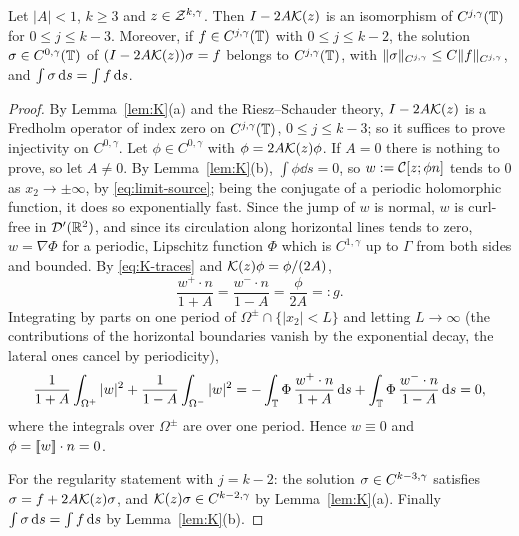 \begin{proposition}\label{prop:invert}
Let $|A|<1$, $k\ge3$ and $z\in\mathcal{Z}^{k,\gamma}$. Then $I-2A\mathcal{K}(z)$ is an isomorphism of $C^{j,\gamma}(\mathbb{T})$ for $0\le j\le k-3$. Moreover, if $f\in C^{j,\gamma}(\mathbb{T})$ with $0\le j\le k-2$, the
solution $\sigma\in C^{0,\gamma}(\mathbb{T})$ of $(I-2A\mathcal{K}(z))\sigma=f$ belongs to $C^{j,\gamma}(\mathbb{T})$, with $\|\sigma\|_{C^{j,\gamma}}\le C\|f\|_{C^{j,\gamma}}$, and $\int\sigma\,\mathrm{d} s=\int f\,\mathrm{d} s$.
\end{proposition}

\begin{proof}
By Lemma~\ref{lem:K}(a) and the Riesz--Schauder theory, $I-2A\mathcal{K}(z)$ is a Fredholm operator of index zero on $C^{j,\gamma}(\mathbb{T})$, $0\le j\le k-3$; so it suffices to prove injectivity on $C^{0,\gamma}$.
Let $\phi\in C^{0,\gamma}$ with $\phi=2A\mathcal{K}(z)\phi$. If $A=0$ there is nothing to prove, so let $A\ne0$. By Lemma~\ref{lem:K}(b), $\int\phi\dd s=0$, so $w:=\mathcal{C}[z;\phi n]$ tends to $0$ as
$x_2\to\pm\infty$, by \eqref{eq:limit-source}; being the conjugate of a periodic holomorphic function, it does so exponentially fast. Since the jump of $w$ is normal, $w$ is curl-free in $\mathcal D'(\mathbb{R}^2)$,
and since its circulation along horizontal lines tends to zero, $w=\nabla\Phi$ for a periodic, Lipschitz function $\Phi$ which is $C^{1,\gamma}$ up to $\Gamma$ from both sides and bounded.
By \eqref{eq:K-traces} and $\mathcal{K}(z)\phi=\phi/(2A)$,
\[
\frac{w^+\cdot n}{1+A}=\frac{w^-\cdot n}{1-A}=\frac{\phi}{2A}=:g .
\]
Integrating by parts on one period of $\Omega^\pm\cap\{|x_2|<L\}$ and letting $L\to\infty$ (the contributions of the horizontal boundaries vanish by the exponential decay, the lateral ones cancel by periodicity),
\[
\frac1{1+A}\int_{\Omega^+}|w|^2+\frac1{1-A}\int_{\Omega^-}|w|^2=-\int_{\mathbb{T}}\Phi\,\frac{w^+\cdot n}{1+A}\,\mathrm{d} s+\int_{\mathbb{T}}\Phi\,\frac{w^-\cdot n}{1-A}\,\mathrm{d} s=0,
\]
where the integrals over $\Omega^\pm$ are over one period. Hence $w\equiv0$ and $\phi=[\![w]\!]\cdot n=0$.

For the regularity statement with $j=k-2$: the solution $\sigma\in C^{k-3,\gamma}$ satisfies $\sigma=f+2A\mathcal{K}(z)\sigma$, and $\mathcal{K}(z)\sigma\in C^{k-2,\gamma}$ by Lemma~\ref{lem:K}(a). Finally
$\int\sigma\,\mathrm{d} s=\int f\,\mathrm{d} s$ by Lemma~\ref{lem:K}(b).
\end{proof}

